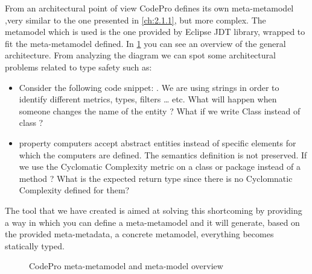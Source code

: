 	From an architectural point of view CodePro defines its own meta-metamodel 
,very similar to the one presented in \ref{ch:2.1.1}, but more complex. The
metamodel which is used is the one provided by Eclipse JDT library, wrapped to fit the
meta-metamodel defined. In \ref{fig:codeProUML} you can see an overview of the
general architecture. From analyzing the diagram we can spot some architectural 
problems related to type safety such as:
	\begin{itemize}
	  \item Consider the following code snippet: . We are using strings in order to
	  identify different metrics, types, filters \ldots{} etc.  
	  What will happen when someone changes the name of the entity ? What if we write Class instead of class ? \\
	 
	  \item property computers accept abstract entities instead of specific 
elements for which the computers are defined. The semantics definition is not 
preserved. If we use the Cyclomatic Complexity metric on a class or package  
instead of a method ? What is the expected return type since there is no
Cyclomnatic Complexity defined for them?\\

	\end{itemize}
	The tool that we have created is aimed at solving this shortcoming by providing
a way in which you can define a meta-metamodel and it will generate, based on
the provided meta-metadata, a concrete metamodel, everything becomes statically
typed.

\begin{figure}
\centering
{}
\caption{CodePro meta-metamodel and meta-model overview}
\label{fig:codeProUML}
\end{figure}

